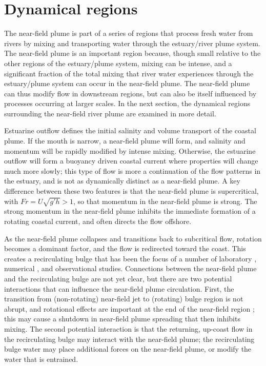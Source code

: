 \documentclass[12pt]{article}
\begin{document}
\section{Dynamical regions}

The near-field plume is part of a series of regions that process fresh water from rivers by mixing and transporting water through the estuary/river plume system. The near-field plume is an important region because, though small relative to the other regions of the estuary/plume system, mixing can be intense, and a significant fraction of the total mixing that river water experiences through the estuary/plume system can occur in the near-field plume. The near-field plume can thus modify flow in downstream regions, but can also be itself influenced by processes occurring at larger scales. In the next section, the dynamical regions surrounding the near-field river plume are examined in more detail. 

Estuarine outflow defines the initial salinity and volume transport of the coastal plume.  If the mouth is narrow, a near-field plume will form, and salinity and momentum will be rapidly modified by intense mixing. Otherwise, the estuarine outflow will form a buoyancy driven coastal current where properties will change much more slowly; this type of flow is more a continuation of the flow patterns in the estuary, and is not as dynamically distinct as a near-field plume. A key difference between these two features is that the near-field plume is supercritical, with $Fr = U \sqrt{g' h} > 1$, so that momentum in the near-field plume is strong. The strong momentum in the near-field plume inhibits the immediate formation of a rotating coastal current, and often directs the flow offshore. 

As the near-field plume collapses and transitions back to subcritical flow, rotation becomes a dominant factor, and the flow is redirected toward the coast. This creates a recirculating bulge that has been the focus of a number of laboratory \citep{avicola.huq:03b,horner-devine.ea:06}, numerical \citep{fong.geyer:02,isobe:05}, and observational \citep{horner-devine:09,kudela.ea:10} studies. Connections between the near-field plume and the recirculating bulge are not yet clear, but there are two potential interactions that can influence the near-field plume circulation. First, the transition from (non-rotating) near-field jet to (rotating) bulge region is not abrupt, and rotational effects are important at the end of the near-field region \citep{cole.dissertation}; this may cause a shutdown in near-field plume spreading that then inhibits mixing. The second potential interaction is that the returning, up-coast flow in the recirculating bulge may interact with the near-field plume; the recirculating bulge water may place additional forces on the near-field plume, or modify the water that is entrained.
\end{document}
